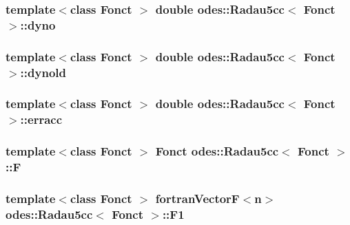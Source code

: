 \hypertarget{classodes_1_1Radau5cc_a36cb3bec1d0c8e1f6ea23eec088d5fa7}{
\subsubsection[{dyno}]{\setlength{\rightskip}{0pt plus 5cm}template$<$class Fonct $>$ double {\bf odes\-::\-Radau5cc}$<$ Fonct $>$\-::dyno\hspace{0.3cm}{\ttfamily [private]}}}\label{classodes_1_1Radau5cc_a36cb3bec1d0c8e1f6ea23eec088d5fa7}
\hypertarget{classodes_1_1Radau5cc_a5d60671c8cf94cc855a57a2afe201565}{
\subsubsection[{dynold}]{\setlength{\rightskip}{0pt plus 5cm}template$<$class Fonct $>$ double {\bf odes\-::\-Radau5cc}$<$ Fonct $>$\-::dynold\hspace{0.3cm}{\ttfamily [private]}}}\label{classodes_1_1Radau5cc_a5d60671c8cf94cc855a57a2afe201565}
\hypertarget{classodes_1_1Radau5cc_a54eb4159056970d5c2c3ea85e79154bb}{
\subsubsection[{erracc}]{\setlength{\rightskip}{0pt plus 5cm}template$<$class Fonct $>$ double {\bf odes\-::\-Radau5cc}$<$ Fonct $>$\-::erracc\hspace{0.3cm}{\ttfamily [private]}}}\label{classodes_1_1Radau5cc_a54eb4159056970d5c2c3ea85e79154bb}
\hypertarget{classodes_1_1Radau5cc_addca7bd0b74d75fd6f453969f6a619e2}{
\subsubsection[{F}]{\setlength{\rightskip}{0pt plus 5cm}template$<$class Fonct $>$ Fonct {\bf odes\-::\-Radau5cc}$<$ Fonct $>$\-::F\hspace{0.3cm}{\ttfamily [protected]}}}\label{classodes_1_1Radau5cc_addca7bd0b74d75fd6f453969f6a619e2}
\hypertarget{classodes_1_1Radau5cc_a7de9ff28e7bc72516e36010c8d2d65b9}{
\subsubsection[{F1}]{\setlength{\rightskip}{0pt plus 5cm}template$<$class Fonct $>$ {\bf fortran\-Vector\-F}$<${\bf n}$>$ {\bf odes\-::\-Radau5cc}$<$ Fonct $>$\-::F1\hspace{0.3cm}{\ttfamily [protected]}}}\label{classodes_1_1Radau5cc_a7de9ff28e7bc72516e36010c8d2d65b9}
